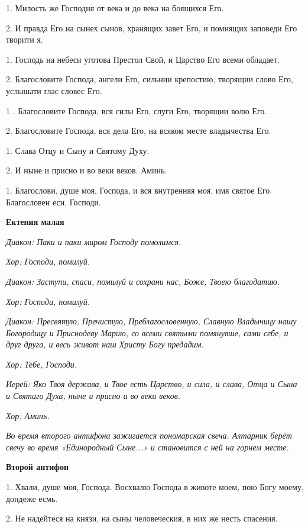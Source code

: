 1. Милость же Господня от века и до века на боящихся Его. 


2. И правда Его на сынех сынов, хранящих завет Его, и помнящих заповеди Его творити я. 


1. Господь на небеси уготова Престол Свой, и Царство Его всеми обладает. 


2. Благословите Господа, ангели Его,  сильнии крепостию, творящии слово Его, услышати глас словес Его. 


1 . Благословите Господа, вся силы Его, слуги Его, творящии волю Его. 


2. Благословите Господа, вся дела Его, на всяком месте владычества Его. 


1. Слава Отцу и Сыну и Святому Духу. 


2. И ныне и присно и во веки веков. Аминь. 


1. Благослови, душе моя, Господа, и вся внутренняя моя, имя святое Его. Благословен еси, Господи.


\medskip
\bfseries Ектения малая \normalfont{}


\medskip
\itshape Диакон:\normalfont{} Паки и паки миром Господу помолимся. 


\itshape Хор:\normalfont{} Господи, помилуй. 


\itshape Диакон:\normalfont{} Заступи, спаси, помилуй и сохрани нас, Боже, Твоею благодатию. 


\itshape Хор:\normalfont{} Господи, помилуй. 


\itshape Диакон:\normalfont{} Пресвятую, Пречистую, Преблагословенную, Славную Владычицу нашу Богородицу и Приснодеву Марию, со всеми святыми помянувше, сами себе, и друг друга, и весь живот наш Христу Богу предадим. 


\itshape Хор:\normalfont{} Тебе, Господи. 


\itshape Иерей:\normalfont{} Яко Твоя держава, и Твое есть Царство, и сила, и слава, Отца и Сына и Святаго Духа, ныне и присно и во веки веков. 


\itshape Хор:\normalfont{} Аминь. 


\itshape Во время второго антифона зажигается пономарская свеча. Алтарник берёт свечу во время «Единородный Сыне...» и становится с ней на горнем месте.\normalfont{}


\medskip
\bfseries Второй антифон \normalfont{}


1. Хвали, душе моя, Господа. Восхвалю Господа в животе моем, пою Богу моему, дондеже есмь. 


2. Не надейтеся на князи, на сыны человеческия, в них же несть спасения. 


